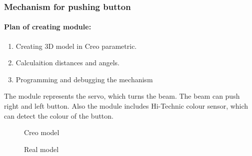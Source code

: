 \subsubsection{Mechanism for pushing button}
\paragraph{Plan of creating module:}	
	
	\begin{enumerate}
		\item Creating 3D model in Creo parametric.
		\item Calculaition distances and angels.
		\item  Programming and debugging the mechanism
	\end{enumerate}
	The module represents the servo, which turns the beam. The beam can push right and left button. Also the module includes Hi-Technic colour sensor, which can detect the colour of the button.	
  \begin{figure}[H]
		\begin{minipage}[h]{\linewidth}
			\caption{Creo model}
		\end{minipage}
	\end{figure}
  \begin{figure}[H]
		\begin{minipage}[h]{\linewidth}
			\caption{Real model}
		\end{minipage}
	\end{figure}
	
